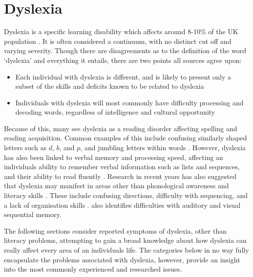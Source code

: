 \documentclass[journal]{IEEEtran}
\begin{document}
\section{Dyslexia}
\label{sec:dyslexia}

Dyslexia is a specific learning disability which affects around 8-10\% of the UK population \cite{Nhs,bda}. It is often considered a continuum, with no distinct cut off and varying severity. Though there are disagreements as to the definition of the word `dyslexia' and everything it entails, there are two points all sources agree upon:
 
\begin{itemize}
\item Each individual with dyslexia is different, and is likely to present only a
	subset of the skills and deficits known to be related to dyslexia 
\item Individuals with dyslexia will most commonly have difficulty processing
	and decoding words, regardless of intelligence and cultural opportunity
\end{itemize}

Because of this, many see dyslexia as a reading disorder affecting spelling and reading acquisition. Common examples of this include confusing similarly shaped letters such as $d$, $b$, and $p$, and jumbling letters within words \cite{DetectAndManage}. However, dyslexia has also been linked to verbal memory and processing speed, affecting an individuals ability to remember verbal information such as lists and sequences, and their ability to read fluently \cite{Nhs, RoseReview}. Research in recent years has also suggested that dyslexia may manifest in areas other than phonological awareness and literacy skills \cite{snowling, DetectAndManage}.  These include confusing directions, difficulty with sequencing, and a lack of organisation skills \cite{bda}. \cite{DetectAndManage} also identifies difficulties with auditory and visual sequential memory.

The following sections consider reported symptoms of dyslexia, other than literacy problems, attempting to gain a broad knowledge about how dyslexia can really affect every area of an individuals life. The categories below in no way fully encapsulate the problems associated with dyslexia, however, provide an insight into the most commonly experienced and researched issues.
\end{document}
